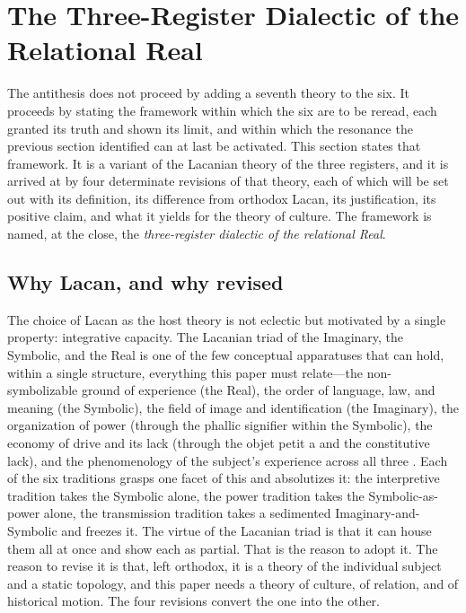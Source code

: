 \section{The Three-Register Dialectic of the Relational Real}
\label{p24:sec:manifesto}

\noindent
The antithesis does not proceed by adding a seventh theory to the six. It proceeds by stating the framework within which the six are to be reread, each granted its truth and shown its limit, and within which the resonance the previous section identified can at last be activated. This section states that framework. It is a variant of the Lacanian theory of the three registers, and it is arrived at by four determinate revisions of that theory, each of which will be set out with its definition, its difference from orthodox Lacan, its justification, its positive claim, and what it yields for the theory of culture. The framework is named, at the close, the \emph{three-register dialectic of the relational Real}.

\subsection*{Why Lacan, and why revised}

The choice of Lacan as the host theory is not eclectic but motivated by a single property: integrative capacity. The Lacanian triad of the Imaginary, the Symbolic, and the Real is one of the few conceptual apparatuses that can hold, within a single structure, everything this paper must relate---the non-symbolizable ground of experience (the Real), the order of language, law, and meaning (the Symbolic), the field of image and identification (the Imaginary), the organization of power (through the phallic signifier within the Symbolic), the economy of drive and its lack (through the objet petit a and the constitutive lack), and the phenomenology of the subject's experience across all three \parencite{lacan2006ecrits,lacan1977xi}. Each of the six traditions grasps one facet of this and absolutizes it: the interpretive tradition takes the Symbolic alone, the power tradition takes the Symbolic-as-power alone, the transmission tradition takes a sedimented Imaginary-and-Symbolic and freezes it. The virtue of the Lacanian triad is that it can house them all at once and show each as partial. That is the reason to adopt it. The reason to revise it is that, left orthodox, it is a theory of the individual subject and a static topology, and this paper needs a theory of culture, of relation, and of historical motion. The four revisions convert the one into the other.

